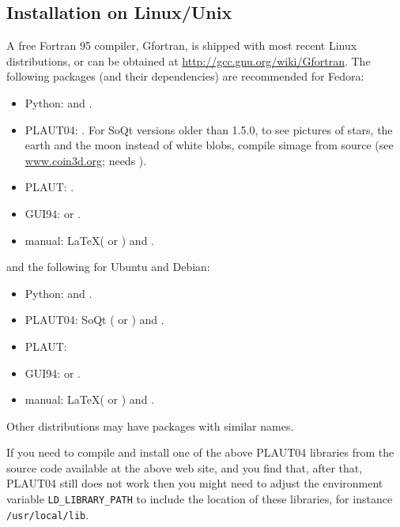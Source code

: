\documentclass[12pt]{report}
\begin{document}
\subsection{Installation on Linux/Unix}
A free Fortran 95 compiler, Gfortran, is shipped with most recent
Linux distributions, or can be obtained at 
\url{http://gcc.gnu.org/wiki/Gfortran}.
The following packages (and their dependencies) are recommended for
Fedora:
\begin{itemize}
\item Python:  and .
\item {\cal PLAUT04}: . For SoQt versions older than
1.5.0, to see pictures of stars, the earth
and the moon instead of white blobs, compile simage from
source (see \url{www.coin3d.org}; needs ).
\item {\cal PLAUT}: .
\item GUI94:  or .
\item manual: \LaTeX ( or ) and .
\end{itemize}
and the following for Ubuntu and Debian:
\begin{itemize}
\item Python:  and .
\item {\cal PLAUT04}: SoQt ( or ) and
.
\item {\cal PLAUT}: 
\item GUI94:  or .
\item manual: \LaTeX ( or ) and .
\end{itemize}
Other distributions may have packages with similar names.

If you need to compile and install one of the above {\cal PLAUT04} libraries
from the source code available at the above web site, and you
find that, after that, {\cal PLAUT04} still does not work then you might need to
adjust the environment variable {\tt LD\_LIBRARY\_PATH} to include
the location of these libraries, for instance {\tt /usr/local/lib}.
\end{document}
